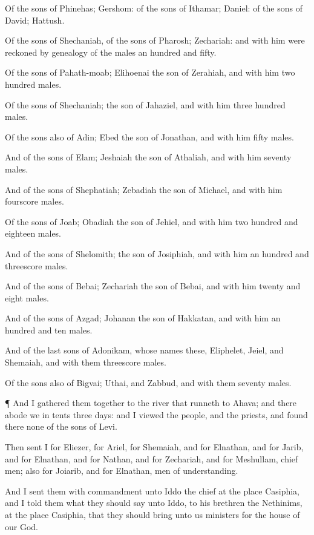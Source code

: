 {Of the
sons of
Phinehas;
Gershom: of the
sons of
Ithamar;
Daniel: of the
sons of
David;
Hattush.

Of the
sons of
Shechaniah, of the
sons of
Pharosh;
Zechariah: and with him were reckoned by
genealogy of the
males an
hundred and
fifty.

Of the
sons of
Pahath-moab;
Elihoenai the
son of
Zerahiah, and with him two
hundred
males.

Of the
sons of
Shechaniah; the
son of
Jahaziel, and with him
three
hundred
males.

Of the
sons also of
Adin;
Ebed the
son of
Jonathan, and with him
fifty
males.

And of the
sons of
Elam;
Jeshaiah the
son of
Athaliah, and with him
seventy
males.

And of the
sons of
Shephatiah;
Zebadiah the
son of
Michael, and with him
fourscore
males.

Of the
sons of
Joab;
Obadiah the
son of
Jehiel, and with him two
hundred and
eighteen
males.

And of the
sons of
Shelomith; the
son of
Josiphiah, and with him an
hundred and
threescore
males.

And of the
sons of
Bebai;
Zechariah the
son of
Bebai, and with him
twenty and
eight
males.

And of the
sons of
Azgad;
Johanan the
son of
Hakkatan, and with him an
hundred and
ten
males.

And of the
last
sons of
Adonikam, whose
names
{} these,
Eliphelet,
Jeiel, and
Shemaiah, and with them
threescore
males.

Of the
sons also of
Bigvai;
Uthai, and
Zabbud, and with them
seventy
males.


\par }{\PP {}¶ And I gathered them
together to the
river that
runneth to
Ahava; and there abode we in
tents
three
days: and I
viewed the
people, and the
priests, and
found there none of the
sons of
Levi.

Then
sent I for
Eliezer, for
Ariel, for
Shemaiah, and for
Elnathan, and for
Jarib, and for
Elnathan, and for
Nathan, and for
Zechariah, and for
Meshullam, chief
men; also for
Joiarib, and for
Elnathan, men of
understanding.

And I
sent them with
commandment unto
Iddo the
chief at the
place
Casiphia, and I
told them
what they should
say unto
Iddo,
{} to his
brethren the
Nethinims, at the
place
Casiphia, that they should
bring unto us
ministers for the
house of our
God.

}
